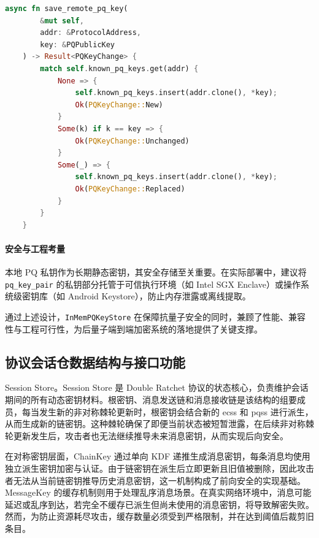 \begin{itemize}
    \begin{lstlisting}[language=Rust, caption={\texttt{save\_remote\_pq\_key} 逻辑示意}, label=lst:pq_save_key]
    async fn save_remote_pq_key(
        &mut self,
        addr: &ProtocolAddress,
        key: &PQPublicKey
    ) -> Result<PQKeyChange> {
        match self.known_pq_keys.get(addr) {
            None => {
                self.known_pq_keys.insert(addr.clone(), *key);
                Ok(PQKeyChange::New)
            }
            Some(k) if k == key => {
                Ok(PQKeyChange::Unchanged)
            }
            Some(_) => {
                self.known_pq_keys.insert(addr.clone(), *key);
                Ok(PQKeyChange::Replaced)
            }
        }
    }
    \end{lstlisting}
    
    \paragraph{安全与工程考量}
    \label{subsec:pq_security}
    本地 PQ 私钥作为长期静态密钥，其安全存储至关重要。在实际部署中，建议将 \texttt{pq\_key\_pair} 的私钥部分托管于可信执行环境（如 Intel SGX Enclave）或操作系统级密钥库（如 Android Keystore），防止内存泄露或离线提取。
    
    通过上述设计，\texttt{InMemPQKeyStore} 在保障抗量子安全的同时，兼顾了性能、兼容性与工程可行性，为后量子端到端加密系统的落地提供了关键支撑。


    
\end{itemize}

\subsection{协议会话仓数据结构与接口功能}
    Session Store。Session Store 是 Double Ratchet 协议的状态核心，负责维护会话期间的所有动态密钥材料。根密钥、消息发送链和消息接收链是该结构的组要成员，每当发生新的非对称棘轮更新时，根密钥会结合新的 ecss 和 pqss 进行派生，从而生成新的链密钥。这种棘轮确保了即便当前状态被短暂泄露，在后续非对称棘轮更新发生后，攻击者也无法继续推导未来消息密钥，从而实现后向安全。
   
   在对称密钥层面，ChainKey 通过单向 KDF 递推生成消息密钥，每条消息均使用独立派生密钥加密与认证。由于链密钥在派生后立即更新且旧值被删除，因此攻击者无法从当前链密钥推导历史消息密钥，这一机制构成了前向安全的实现基础。MessageKey 的缓存机制则用于处理乱序消息场景。在真实网络环境中，消息可能延迟或乱序到达，若完全不缓存已派生但尚未使用的消息密钥，将导致解密失败。然而，为防止资源耗尽攻击，缓存数量必须受到严格限制，并在达到阈值后裁剪旧条目。
   
